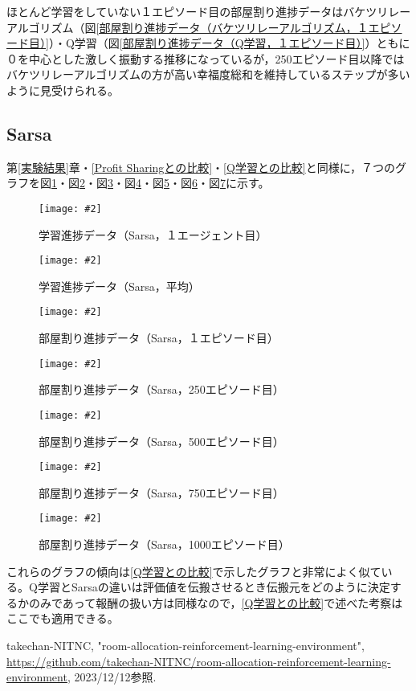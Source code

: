 \documentclass[titlepage]{ltjsreport}
\newcommand{\image}[2]{\begin{figure}[h]\vspace{1em}\begin{center}\texttt{[image: \#2]}\caption{#1}\label{#1}\end{center}\end{figure}}
\begin{document}
ほとんど学習をしていない１エピソード目の部屋割り進捗データはバケツリレーアルゴリズム（図\ref{部屋割り進捗データ（バケツリレーアルゴリズム，１エピソード目）}）・Q学習（図\ref{部屋割り進捗データ（Q学習，１エピソード目）}）ともに０を中心とした激しく振動する推移になっているが，250エピソード目以降ではバケツリレーアルゴリズムの方が高い幸福度総和を維持しているステップが多いように見受けられる。
\subsection{Sarsa}
第\ref{実験結果}章・\ref{Profit Sharingとの比較}・\ref{Q学習との比較}と同様に，７つのグラフを図\ref{学習進捗データ（Sarsa，１エージェント目）}・図\ref{学習進捗データ（Sarsa，平均）}・図\ref{部屋割り進捗データ（Sarsa，１エピソード目）}・図\ref{部屋割り進捗データ（Sarsa，250エピソード目）}・図\ref{部屋割り進捗データ（Sarsa，500エピソード目）}・図\ref{部屋割り進捗データ（Sarsa，750エピソード目）}・図\ref{部屋割り進捗データ（Sarsa，1000エピソード目）}に示す。
\image{学習進捗データ（Sarsa，１エージェント目）}{外部ファイル/学習進捗データ/Sarsa/１エージェント目.png}
\image{学習進捗データ（Sarsa，平均）}{外部ファイル/学習進捗データ/Sarsa/平均.png}
\image{部屋割り進捗データ（Sarsa，１エピソード目）}{外部ファイル/部屋割り進捗データ/Sarsa/１エピソード目}
\image{部屋割り進捗データ（Sarsa，250エピソード目）}{外部ファイル/部屋割り進捗データ/Sarsa/250エピソード目}
\image{部屋割り進捗データ（Sarsa，500エピソード目）}{外部ファイル/部屋割り進捗データ/Sarsa/500エピソード目}
\image{部屋割り進捗データ（Sarsa，750エピソード目）}{外部ファイル/部屋割り進捗データ/Sarsa/750エピソード目}
\image{部屋割り進捗データ（Sarsa，1000エピソード目）}{外部ファイル/部屋割り進捗データ/Sarsa/1000エピソード目}

これらのグラフの傾向は\ref{Q学習との比較}で示したグラフと非常によく似ている。Q学習とSarsaの違いは評価値を伝搬させるとき伝搬元をどのように決定するかのみであって報酬の扱い方は同様なので，\ref{Q学習との比較}で述べた考察はここでも適用できる。
\begin{thebibliography}{99}
 takechan-NITNC, "room-allocation-reinforcement-learning-environment", \url{https://github.com/takechan-NITNC/room-allocation-reinforcement-learning-environment}, 2023/12/12参照.
\end{thebibliography}
\end{document}
